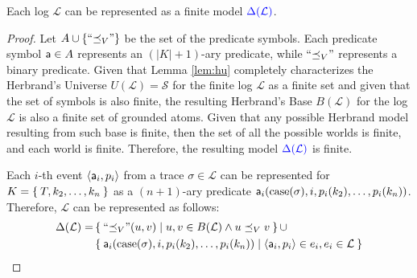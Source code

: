 \begin{lemma}
	Each log $\mathcal{L}$ can be represented as a finite model $\color{blue}\Delta(\mathcal{L})$.
\end{lemma}
\begin{proof}
	Let  $A\cup\{\mathtt{``}{\preceq_V}\mathtt{"}\}$ be the set of the predicate symbols. Each predicate symbol $\mathsf{a}\in A$ represents an $(|K|+1)$-ary predicate, while $\mathtt{``}{\preceq_V}\mathtt{"}$ represents a binary predicate. Given that Lemma \ref{lem:hu} completely characterizes the Herbrand's Universe $U(\mathcal{L})=\mathcal{S}$ for the finite log $\mathcal{L}$ as a finite set and given that the set of symbols is also finite, the resulting Herbrand's Base $B(\mathcal{L})$ for the log $\mathcal{L}$ is also a finite set of grounded atoms. Given that any possible Herbrand model resulting from such base is finite, then the set of all the possible {\color{blue}worlds} is finite, and each {\color{blue}world} is finite. Therefore, the resulting model $\color{blue}\Delta(\mathcal{L})$ is finite.
	
	
	Each $i$-th event $\Braket{\mathsf{a}_i,p_i}$ from a trace $\sigma\in\mathcal{L}$ can be represented for $K=\Set{T,k_2,\dots,k_n}$ as a $(n+1)$-ary predicate $\mathsf{a}_i(\textup{case}(\sigma),i,p_i(k_2),\dots,p_i(k_n))$. Therefore, $\mathcal{L}$ can be represented as follows:
	\begin{align*}
	\Delta(\mathcal{L})=&\Set{\mathtt{``}{\preceq_V}\mathtt{"}(u,v)|u,v\in B(\mathcal{L})\wedge u\preceq_V v}\cup\\
	&\Set{\mathsf{a}_i(\textup{case}(\sigma),i,p_i(k_2),\dots,p_i(k_n))|\Braket{\mathsf{a}_i,p_i}\in e_i,e_i\in\mathcal{L}}
	\end{align*}
\end{proof}

